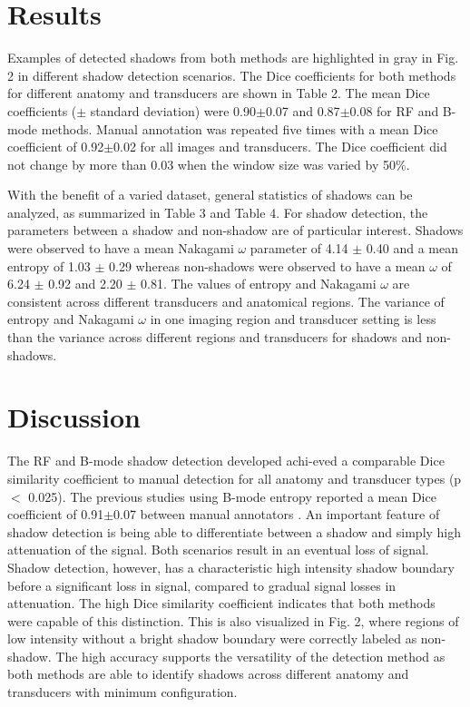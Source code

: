 \documentclass[authoryear,preprint,review,12pt]{elsarticle}
\begin{document}
\section*{Results}
\label{Results}
Examples of detected shadows from both methods are highlighted in gray in Fig. 2 in different shadow detection scenarios. The Dice coefficients for both methods for different anatomy and transducers are shown in Table 2. The mean Dice coefficients ($\pm$ standard deviation) were 0.90$\pm$0.07 and 0.87$\pm$0.08 for RF and B-mode methods. Manual annotation was repeated five times with a mean Dice coefficient of 0.92$\pm$0.02 for all images and transducers. The Dice coefficient did not change by more than 0.03 when the window size was varied by 50\%.

With the benefit of a varied dataset, general statistics of shadows can be analyzed, as summarized in Table 3 and Table 4. For shadow detection, the parameters between a shadow and non-shadow are of particular interest. Shadows were observed to have a mean Nakagami $\omega$ parameter of 4.14 $\pm$ 0.40 and a mean entropy of 1.03 $\pm$ 0.29 whereas non-shadows were observed to have a mean $\omega$ of 6.24 $\pm$ 0.92 and 2.20 $\pm$ 0.81. The values of entropy and Nakagami $\omega$ are consistent across different transducers and anatomical regions. The variance of entropy and Nakagami $\omega$ in one imaging region and transducer setting is less than the variance across different regions and transducers for shadows and non-shadows. 


\section*{Discussion}
\label{Discuss}
The RF and B-mode shadow detection developed achi-eved a comparable Dice similarity coefficient to manual detection for all anatomy and transducer types (p $<$ 0.025). The previous studies using B-mode entropy reported a mean Dice coefficient of 0.91$\pm$0.07 between manual annotators  \citep{Hellier2010}. An important feature of shadow detection is being able to differentiate between a shadow and simply high attenuation of the signal. Both scenarios result in an eventual loss of signal. Shadow detection, however, has a characteristic high intensity shadow boundary before a significant loss in signal, compared to gradual signal losses in attenuation. The high Dice similarity coefficient indicates that both methods were capable of this distinction. This is also visualized in Fig. 2, where regions of low intensity without a bright shadow boundary were correctly labeled as non-shadow. The high accuracy supports the versatility of the detection method as both methods are able to identify shadows across different anatomy and transducers with minimum configuration. 
\end{document}
